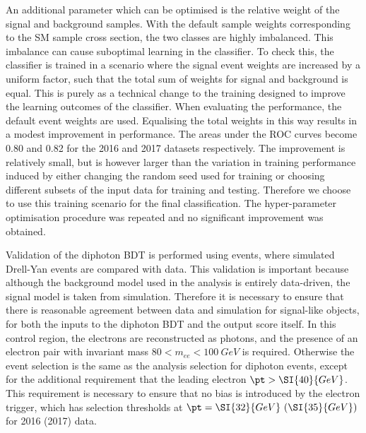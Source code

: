 An additional parameter which can be optimised is the relative weight 
of the signal and background samples.
With the default sample weights corresponding to the SM sample cross section, 
the two classes are highly imbalanced.
This imbalance can cause suboptimal learning in the classifier.
To check this, the classifier is trained in a scenario 
where the signal event weights are increased by a uniform factor, 
such that the total sum of weights for signal and background is equal.
This is purely as a technical change to the training 
designed to improve the learning outcomes of the classifier.
When evaluating the performance, the default event weights are used.
Equalising the total weights in this way results in a modest improvement in performance.
The areas under the ROC curves become 0.80 and 0.82 for the 2016 and 2017 datasets respectively.
The improvement is relatively small, 
but is however larger than the variation 
in training performance induced by either changing the random seed used for training or 
choosing different subsets of the input data for training and testing.
Therefore we choose to use this training scenario for the final classification.
The hyper-parameter optimisation procedure was repeated 
and no significant improvement was obtained.


Validation of the diphoton BDT is performed using \Zee events, 
where simulated Drell-Yan events are compared with data.
This validation is important because although the background model used in the analysis 
is entirely data-driven, the signal model is taken from simulation.
Therefore it is necessary to ensure that there is reasonable agreement 
between data and simulation for signal-like objects,
for both the inputs to the diphoton BDT and the output score itself.
In this \Zee control region, the electrons are reconstructed as photons, 
and the presence of an electron pair with invariant mass $80 < m_{ee} < \SI{100}{GeV}$ is required.
Otherwise the event selection is the same as the analysis selection for diphoton events, 
except for the additional requirement that the leading electron $\pt > \SI{40}{GeV}$.
This requirement is necessary to ensure that no bias is introduced by the electron trigger, 
which has selection thresholds at $\pt = \SI{32}{GeV}~(\SI{35}{GeV})$ for 2016 (2017) data.

